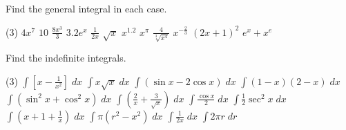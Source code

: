 \begin{Exercise}[title={Standard Integrals},label=exStandardIntegrals]
	\Question Find the general integral in each case. 
	\begin{tasks}(3)
		\task $4 x^{7}$ %
		\task $10$ %
		\task $\frac{8 x^{3}}{3}$ %
		\task $3.2 e^{x}$  %
		\task $\frac{1}{2 x}$ %
		\task $\sqrt{x}$ %
		\task $x^{1.2}$ %
		\task $x^{\pi }$ %
		\task $\frac{4}{\sqrt[{3}]{x^{4}}}$ %
		\task $x^{ -\frac{2}{3}}$ %
		\task $\left (2 x +1\right )^{2}$ %
		\task $e^{x} +x^{e}$ %
	\end{tasks}

	\Question Find the indefinite integrals.
	\begin{tasks}(3)
		\task $\int \left [x -\frac{1}{x^{2}}\right ]\; d x$ %
		\task $\int x \sqrt{x}\; d x$ %
		\task $\int \left (\sin  x -2 \cos  x\right )\; d x$  %
		\task $\int \left (1 -x\right ) \left (2 -x\right )\; d x$ %
		\task $\int \left (\sin ^{2} x +\cos ^{2} x\right )\; d x$ %
		\task $\int \left (\frac{2}{x} +\frac{3}{\sqrt{x}}\right )\; d x$ %
		\task $\int \frac{\cos  x}{2}\; d x$ %
		\task $\int \frac{1}{2} \sec ^{2} x\; d x$ %
		\task $\int \left (x +1 +\frac{1}{x}\right )\; d x$ %
		\task $\int \pi  \left (r^{2} -x^{2}\right )\; d x$ %
		\task $\int \frac{1}{2 x}\; d x$ %
		\task $\int 2 \pi  r\; d r$ %
	\end{tasks}
\end{Exercise}
